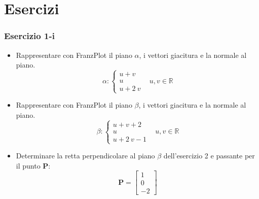\documentclass{beamer}
\newcommand{\frnzplt}{FranzPlot }
\begin{document}
\section{Esercizi}
\begin{frame}
\frametitle{Esercizio 1-i}
\begin{itemize}

\item Rappresentare con \frnzplt il piano $\alpha$, i vettori giacitura e la normale al piano.
\begin{displaymath}
\alpha:
\begin{cases}
u + v\\
u\\
u+2~v
\end{cases}
\;\;\; u,v \in \mathbb{R}
\end{displaymath}
\item Rappresentare con \frnzplt il piano $\beta$, i vettori giacitura e la normale al piano.
\begin{displaymath}
\beta:
\begin{cases}
u + v+2\\
u\\
u+2~v-1
\end{cases}
\;\;\; u,v \in \mathbb{R}
\end{displaymath}
\item
Determinare la retta perpendicolare al piano $\beta$ dell'esercizio 2 e passante per il punto $\mathbf{P}$:
\begin{displaymath}
\mathbf{P} = \begin{bmatrix} 1\\ 0\\-2 \end{bmatrix}
\end{displaymath}
\end{itemize}


\end{frame}
\end{document}
